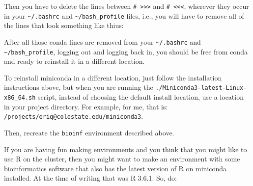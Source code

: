 \documentclass[]{krantz}
\makeatletter
\newenvironment{Shaded}{\begin{snugshade}}{\end{snugshade}}
\newcommand{\BuiltInTok}[1]{#1}
\newcommand{\CommentTok}[1]{\textcolor[rgb]{0.37,0.37,0.37}{\textit{#1}}}
\newcommand{\ExtensionTok}[1]{#1}
\newcommand{\KeywordTok}[1]{\textcolor[rgb]{0.27,0.27,0.27}{\textbf{#1}}}
\newcommand{\NormalTok}[1]{#1}
\newcommand{\OperatorTok}[1]{\textcolor[rgb]{0.43,0.43,0.43}{\textbf{#1}}}
\newcommand{\OtherTok}[1]{\textcolor[rgb]{0.37,0.37,0.37}{#1}}
\newcommand{\StringTok}[1]{\textcolor[rgb]{0.5,0.5,0.5}{#1}}
\newcommand{\VariableTok}[1]{\textcolor[rgb]{0,0,0}{#1}}
\newenvironment{kframe}{%
\medskip{}
\setlength{\fboxsep}{.8em}
 \def\at@end@of@kframe{}%
 \ifinner\ifhmode%
  \def\at@end@of@kframe{\end{minipage}}%
  \begin{minipage}{\columnwidth}%
 \fi\fi%
 \def\FrameCommand##1{\hskip\@totalleftmargin \hskip-\fboxsep
 \colorbox{shadecolor}{##1}\hskip-\fboxsep
     \hskip-\linewidth \hskip-\@totalleftmargin \hskip\columnwidth}%
 \MakeFramed {\advance\hsize-\width
   \@totalleftmargin\z@ \linewidth\hsize
   \@setminipage}}%
 {\par\unskip\endMakeFramed%
 \at@end@of@kframe}
\renewenvironment{Shaded}{\begin{kframe}}{\end{kframe}}
\makeatother
\begin{document}
Then you have to delete the lines between \texttt{\#\ \textgreater{}\textgreater{}\textgreater{}} and \texttt{\#\ \textless{}\textless{}\textless{}}, wherever they occur in your \texttt{\textasciitilde{}/.bashrc} and \texttt{\textasciitilde{}/bash\_profile}
files, i.e., you will have to remove all of the lines that look
something like thius:

\begin{Shaded}
\end{Shaded}

After all those conda lines are removed from your \texttt{\textasciitilde{}/.bashrc} and \texttt{\textasciitilde{}/bash\_profile}, logging out
and logging back in, you should be free from conda and ready to reinstall it in
a different location.

To reinstall miniconda in a different location, just follow the
installation instructions above, but when you are running the
\texttt{./Miniconda3-latest-Linux-x86\_64.sh} script, instead of choosing the default
install location, use a location in your project directory. For example, for me, that is:
\texttt{/projects/eriq@colostate.edu/miniconda3}.

Then, recreate the \texttt{bioinf} environment described above.

If you are having fun making environments and you think that you might like to use R on
the cluster, then you might want to make an environment with some bioinformatics software
that also has
the latest version of R on miniconda installed. At the time of writing that was R 3.6.1. So,
do:
\end{document}

